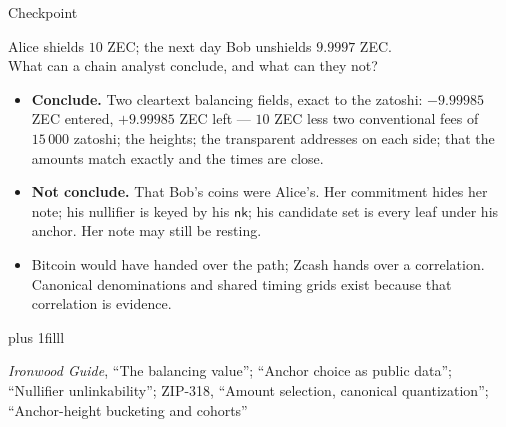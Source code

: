 \documentclass[aspectratio=169,11pt]{beamer}
\newcommand{\nksym}{\ensuremath{\mathsf{nk}}}
\newcommand{\src}[1]{\par\vskip0pt plus 1filll
  {\fontsize{6}{7.2}\selectfont\color{arbdim}\raggedright #1\par}}
\begin{document}
\begin{frame}{Checkpoint}
\begin{center}\large
Alice shields $10$ ZEC; the next day Bob unshields $9.9997$ ZEC.\\
What can a chain analyst conclude, and what can they not?
\end{center}
\pause
\medskip
\small
\begin{itemize}
  \item \textbf{Conclude.} Two cleartext balancing fields, exact to the
    zatoshi: $-9.99985$ ZEC entered, $+9.99985$ ZEC left --- $10$ ZEC
    less two conventional fees of $15\,000$ zatoshi; the heights; the
    transparent addresses on each side; that the amounts match exactly
    and the times are close.
  \item \textbf{Not conclude.} That Bob's coins were Alice's. Her
    commitment hides her note; his nullifier is keyed by his \nksym;
    his candidate set is every leaf under his anchor. Her note may
    still be resting.
  \item Bitcoin would have handed over the path; Zcash hands over a
    correlation. Canonical denominations and shared timing grids exist
    because that correlation is evidence.
\end{itemize}
\src{\emph{Ironwood Guide}, ``The balancing value''; ``Anchor choice as public
  data''; ``Nullifier unlinkability''; ZIP-318, ``Amount selection, canonical
  quantization''; ``Anchor-height bucketing and cohorts''}
\end{frame}

\end{document}
